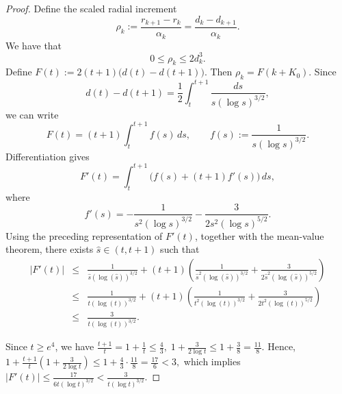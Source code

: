 \documentclass[10pt,a4paper]{amsart}
\newcommand{\nn}{\nonumber}
\begin{document}
\begin{proof}
Define the scaled radial increment
\[
    \rho_k
    :=\frac{r_{k+1}-r_k}{\alpha_k}
    =\frac{d_k-d_{k+1}}{\alpha_k}.
\]
We have that
\begin{equation}
    0\leq \rho_k\leq 2d_k^3.
    \label{eq:app-rho-size}
\end{equation}
Define
$
    F(t):=2(t+1)\bigl(d(t)-d(t+1)\bigr).$
Then \(\rho_k=F(k+K_0)\).  Since
\[
    d(t)-d(t+1)
    =\frac12\int_t^{t+1}
      \frac{ds}{s(\log s)^{3/2}},
\]
we can write
\[
    F(t)=(t+1)\int_t^{t+1}f(s)\,ds,
    \qquad
    f(s):=\frac{1}{s(\log s)^{3/2}}.
\]
Differentiation gives
\[
    F'(t)
    =\int_t^{t+1}\bigl(f(s)+(t+1)f'(s)\bigr)\,ds,
\]
where
\[
    f'(s)
    =-\frac{1}{s^2(\log s)^{3/2}}
     -\frac{3}{2s^2(\log s)^{5/2}}.
\]
Using the preceding representation of $F'(t)$, together with the mean-value theorem, there exists $\widehat s\in(t,t+1)$ such that
\begin{eqnarray*}
|F'(t)|
&\leq& \frac{1}{\widehat s(\log(\widehat s))^{3/2}}
+(t+1)\left(\frac{1}{\widehat s^2(\log(\widehat s))^{3/2}}
+\frac{3}{2\widehat s^2(\log(\widehat s))^{5/2}}\right)\nn\\
&\leq&\frac{1}{t(\log(t))^{3/2}}
+(t+1)\left(\frac{1}{t^2(\log(t))^{3/2}}
+\frac{3}{2t^2(\log(t))^{5/2}}\right)\nn\\
&\leq&\frac{3}{t(\log(t))^{3/2}}.
\end{eqnarray*}

Since \(t\ge e^{4}\), we have
$
\frac{t+1}{t}
=1+\frac1t
\le
\frac43,
\;
1+\frac{3}{2\log t}
\le
1+\frac38
=
\frac{11}{8}.$
Hence,
$
1+\frac{t+1}{t}
\left(
1+\frac{3}{2\log t}
\right)
\le
1+\frac43\cdot\frac{11}{8}
=
\frac{17}{6}
<
3,
$
which implies
$
|F'(t)|
\le
\frac{17}{6t(\log t)^{3/2}}
<
\frac{3}{t(\log t)^{3/2}}.
$


\end{proof}
\end{document}
